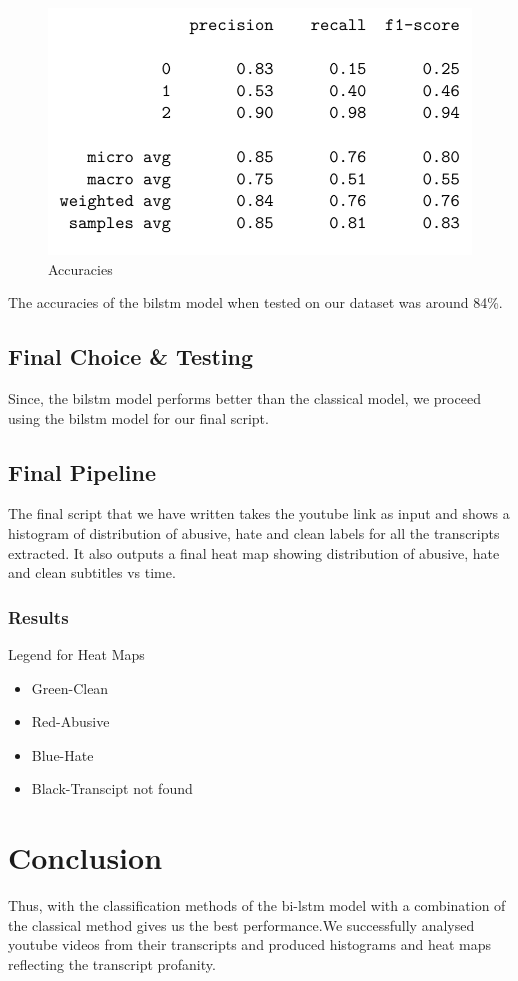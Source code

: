 \documentclass{article}[A4]
\begin{document}
\begin{figure}[!htb]
    \centering
    \includegraphics[scale=0.50]{bilstm.png}
    \caption{Accuracies}
    \label{fig:model_res}
\end{figure}

The accuracies of the bilstm model when tested on our dataset was around 84\%. 
\subsection{Final Choice \& Testing}
Since, the bilstm model performs better than the classical model, we proceed using the bilstm model for our final script.
\subsection{Final Pipeline}
The final script that we have written takes the youtube link as input and shows a histogram of distribution of abusive, hate and clean labels for all the transcripts extracted. It also outputs a final heat map showing distribution of abusive, hate and clean subtitles vs time.
\subsubsection{Results}
Legend for Heat Maps
\begin{itemize}
\item{Green-Clean}
\item{Red-Abusive}
\item{Blue-Hate}
\item{Black-Transcipt not found}
\end{itemize}
\pagebreak[4]


\section{Conclusion}
Thus, with the classification methods of the bi-lstm model with a combination of the classical method gives us the best performance.We successfully analysed youtube videos from their transcripts and produced histograms and heat maps reflecting the transcript profanity.
\end{document}
